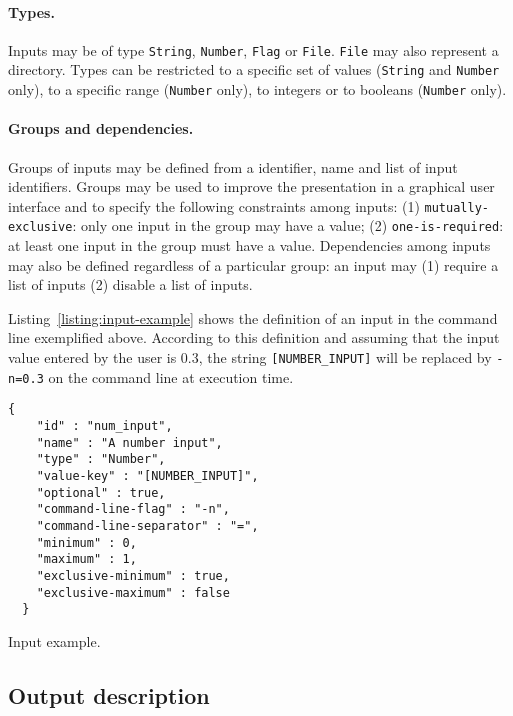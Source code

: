 \documentclass{article}
\begin{document}
\paragraph{Types.} Inputs may be of type \texttt{String},
\texttt{Number}, \texttt{Flag} or \texttt{File}. \texttt{File} may
also represent a directory. Types can be restricted to a specific set
of values (\texttt{String} and \texttt{Number} only), to a specific
range (\texttt{Number} only), to integers or to booleans (\texttt{Number}
only).

\paragraph{Groups and dependencies.} Groups of inputs may be defined
from a identifier, name and list of input identifiers. Groups may be
used to improve the presentation in a graphical user interface and to
specify the following constraints among inputs: (1)
\texttt{mutually-exclusive}: only one input in the group may have a
value; (2) \texttt{one-is-required}: at least one input in the group
must have a value. Dependencies among inputs may also be defined
regardless of a particular group: an input may (1) require a list of
inputs (2) disable a list of inputs.

Listing~\ref{listing:input-example} shows the definition of an input
in the command line exemplified above. According to this definition
and assuming that the input value entered by the user is 0.3, the
string \texttt{[NUMBER\_INPUT]} will be replaced by \texttt{-n=0.3} on
the command line at execution time.
\begin{listing}
\begin{verbatim}
{
    "id" : "num_input",
    "name" : "A number input",
    "type" : "Number",
    "value-key" : "[NUMBER_INPUT]",
    "optional" : true,
    "command-line-flag" : "-n",
    "command-line-separator" : "=",
    "minimum" : 0,
    "maximum" : 1,
    "exclusive-minimum" : true,
    "exclusive-maximum" : false
  }
\end{verbatim}
\caption{Input example.} 
\label{listing:input-example}
\end{listing}

\subsection{Output description}
\end{document}
